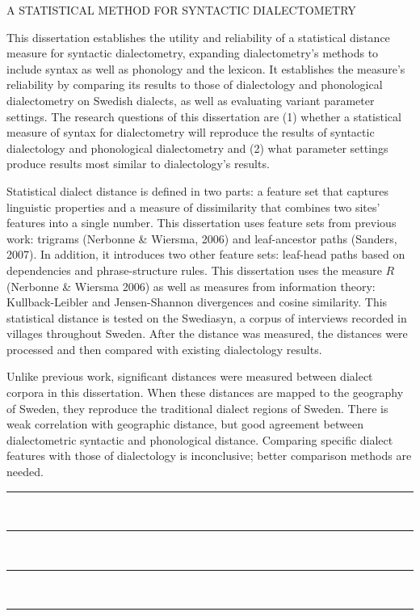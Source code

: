 {\centering A STATISTICAL METHOD FOR SYNTACTIC DIALECTOMETRY
  
}

This dissertation establishes the utility and reliability of a
  statistical distance measure for syntactic dialectometry, expanding
  dialectometry's methods to include syntax as well as phonology and
  the lexicon. It establishes the measure's reliability by comparing
  its results to those of dialectology and phonological dialectometry
  on Swedish dialects, as well as evaluating variant parameter
  settings.
  The
  research questions of this dissertation are (1) whether a
  statistical measure of syntax for dialectometry will reproduce the
  results of syntactic dialectology and phonological dialectometry and
  (2) what parameter settings produce results most similar to
  dialectology's results.
  
  Statistical dialect distance is defined in two parts: a feature set
  that captures linguistic properties and a measure of dissimilarity
  that combines two sites' features into a single number.  This
  dissertation uses feature sets from previous work: trigrams
  (Nerbonne \& Wiersma, 2006) and leaf-ancestor paths (Sanders,
  2007). In addition, it introduces two other feature sets: leaf-head
  paths based on dependencies and phrase-structure rules. This
  dissertation uses the measure $R$ (Nerbonne \& Wiersma 2006) as well
  as measures from information theory: Kullback-Leibler and
  Jensen-Shannon divergences and cosine similarity.
  This statistical distance is tested on the Swediasyn, a corpus of
  interviews recorded in villages throughout Sweden.
  After
  the distance was measured, the distances were processed and then
  compared with existing dialectology results.

  Unlike previous work, significant distances were measured between
  dialect corpora in this dissertation. When these distances are
  mapped to the geography of Sweden, they reproduce the traditional
  dialect regions of Sweden. There is weak correlation with geographic
  distance, but good agreement between dialectometric syntactic and
  phonological distance. Comparing specific dialect features with
  those of dialectology is inconclusive; better comparison methods are
  needed.

\noindent{}\rule{4in}{1pt} \\
\rule{4in}{1pt} \\
\rule{4in}{1pt} \\
\rule{4in}{1pt}

